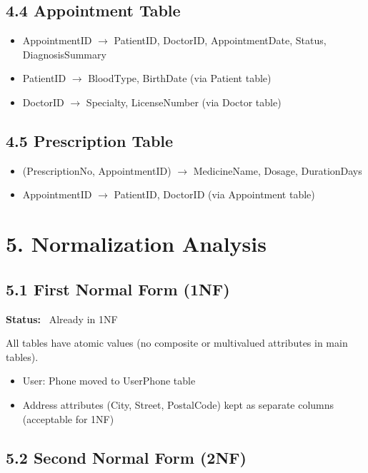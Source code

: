 \subsection*{4.4 Appointment Table}

\begin{itemize}
    \item AppointmentID $\rightarrow$ PatientID, DoctorID, AppointmentDate, Status, DiagnosisSummary
    \item PatientID $\rightarrow$ BloodType, BirthDate (via Patient table)
    \item DoctorID $\rightarrow$ Specialty, LicenseNumber (via Doctor table)
\end{itemize}

\subsection*{4.5 Prescription Table}

\begin{itemize}
    \item (PrescriptionNo, AppointmentID) $\rightarrow$ MedicineName, Dosage, DurationDays
    \item AppointmentID $\rightarrow$ PatientID, DoctorID (via Appointment table)
\end{itemize}

\newpage
\section{5. Normalization Analysis}

\subsection*{5.1 First Normal Form (1NF)}

\textbf{Status:} \checkmark~Already in 1NF

All tables have atomic values (no composite or multivalued attributes in main tables).
\begin{itemize}
    \item User: Phone moved to UserPhone table
    \item Address attributes (City, Street, PostalCode) kept as separate columns (acceptable for 1NF)
\end{itemize}

\subsection*{5.2 Second Normal Form (2NF)}

